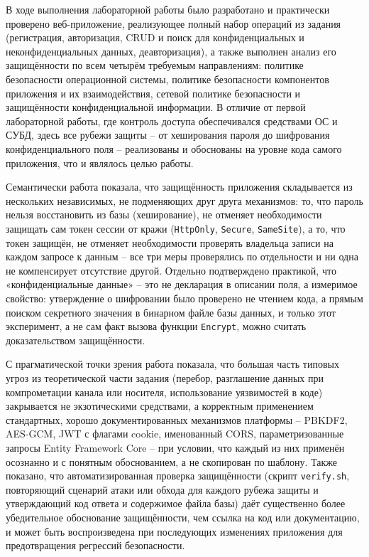 

В ходе выполнения лабораторной работы было разработано и практически
проверено веб-приложение, реализующее полный набор операций из задания
(регистрация, авторизация, CRUD и поиск для конфиденциальных и
неконфиденциальных данных, деавторизация), а также выполнен анализ его
защищённости по всем четырём требуемым направлениям: политике
безопасности операционной системы, политике безопасности компонентов
приложения и их взаимодействия, сетевой политике безопасности и
защищённости конфиденциальной информации. В отличие от первой
лабораторной работы, где контроль доступа обеспечивался средствами ОС и
СУБД, здесь все рубежи защиты -- от хеширования пароля до шифрования
конфиденциального поля -- реализованы и обоснованы на уровне кода самого
приложения, что и являлось целью работы.

Семантически работа показала, что защищённость приложения складывается из
нескольких независимых, не подменяющих друг друга механизмов: то, что
пароль нельзя восстановить из базы (хеширование), не отменяет
необходимости защищать сам токен сессии от кражи (\texttt{HttpOnly},
\texttt{Secure}, \texttt{SameSite}), а то, что токен защищён, не отменяет
необходимости проверять владельца записи на каждом запросе к данным --
все три меры проверялись по отдельности и ни одна не компенсирует
отсутствие другой. Отдельно подтверждено практикой, что «конфиденциальные
данные» -- это не декларация в описании поля, а измеримое свойство:
утверждение о шифровании было проверено не чтением кода, а прямым поиском
секретного значения в бинарном файле базы данных, и только этот
эксперимент, а не сам факт вызова функции \texttt{Encrypt}, можно считать
доказательством защищённости.

С прагматической точки зрения работа показала, что большая часть типовых
угроз из теоретической части задания (перебор, разглашение данных при
компрометации канала или носителя, использование уязвимостей в
коде) закрывается не экзотическими средствами, а корректным применением
стандартных, хорошо документированных механизмов платформы -- PBKDF2,
AES-GCM, JWT с флагами cookie, именованный CORS, параметризованные
запросы Entity Framework Core -- при условии, что каждый из них применён
осознанно и с понятным обоснованием, а не скопирован по шаблону. Также
показано, что автоматизированная проверка защищённости (скрипт
\texttt{verify.sh}, повторяющий сценарий атаки или обхода для каждого
рубежа защиты и утверждающий код ответа и содержимое файла базы) даёт
существенно более убедительное обоснование защищённости, чем ссылка на
код или документацию, и может быть воспроизведена при последующих
изменениях приложения для предотвращения регрессий безопасности.
